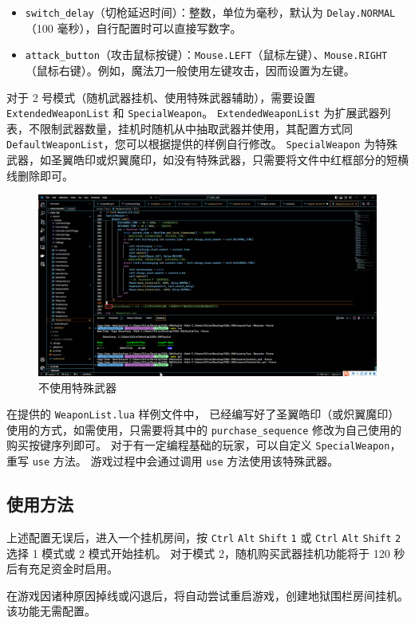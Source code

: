 \begin{itemize}
\item \lstinline{switch_delay}（切枪延迟时间）：整数，单位为毫秒，默认为 \lstinline{Delay.NORMAL}（100 毫秒），自行配置时可以直接写数字。
\item \lstinline{attack_button}（攻击鼠标按键）：\lstinline{Mouse.LEFT}（鼠标左键）、\lstinline{Mouse.RIGHT}（鼠标右键）。例如，魔法刀一般使用左键攻击，因而设置为左键。
\end{itemize}

对于 2 号模式（随机武器挂机、使用特殊武器辅助），需要设置 \lstinline{ExtendedWeaponList} 和 \lstinline{SpecialWeapon}。
\lstinline{ExtendedWeaponList} 为扩展武器列表，不限制武器数量，挂机时随机从中抽取武器并使用，其配置方式同 \lstinline{DefaultWeaponList}，您可以根据提供的样例自行修改。
\lstinline{SpecialWeapon} 为特殊武器，如圣翼皓印或炽翼魔印，如没有特殊武器，只需要将文件中红框部分的短横线删除即可。

\begin{figure}
    \Centering
    \includegraphics[width=\textwidth]{docs/assets/delete_SpecialWeapon.png}
    \caption{不使用特殊武器}
\end{figure}

在提供的 \lstinline{WeaponList.lua} 样例文件中，
已经编写好了圣翼皓印（或炽翼魔印）使用的方式，如需使用，只需要将其中的 \lstinline{purchase_sequence} 修改为自己使用的购买按键序列即可。
对于有一定编程基础的玩家，可以自定义 \lstinline{SpecialWeapon}，重写 \lstinline{use} 方法。
游戏过程中会通过调用 \lstinline{use} 方法使用该特殊武器。

\subsection{使用方法}

上述配置无误后，进入一个挂机房间，按 \lstinline{Ctrl} \lstinline{Alt} \lstinline{Shift} \lstinline{1} 或 \lstinline{Ctrl} \lstinline{Alt} \lstinline{Shift} \lstinline{2} 选择 1 模式或 2 模式开始挂机。
对于模式 2，随机购买武器挂机功能将于 120 秒后有充足资金时启用。

在游戏因诸种原因掉线或闪退后，将自动尝试重启游戏，创建地狱围栏房间挂机。该功能无需配置。